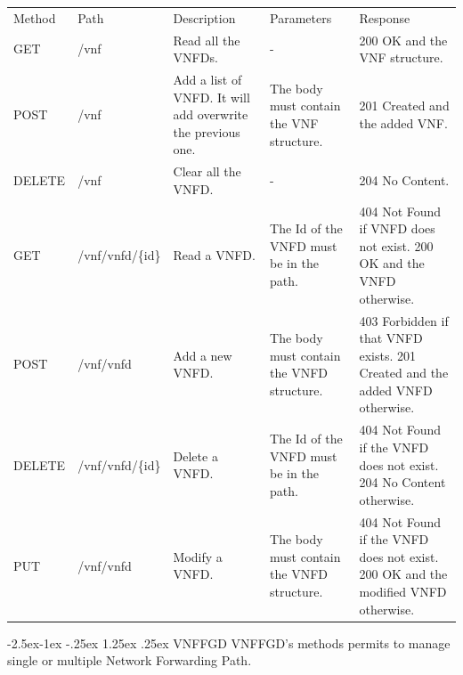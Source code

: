 \documentclass[11pt, english]{article}
\makeatletter
\renewcommand\paragraph{\@startsection{paragraph}{4}{\z@}%
            {-2.5ex\@plus -1ex \@minus -.25ex}%
            {1.25ex \@plus .25ex}%
            {\normalfont\normalsize\bfseries}}
\makeatother
\begin{document}
\begin{tabular}{ |p{2cm}|m{3cm}|p{3cm}|p{3cm}|p{4cm}| }
    \hline
    \rowcolor{black} \multicolumn{5}{|c|}{\textcolor{white}{VNF}} \\
    \hline
    \rowcolor{Gray}
    Method & Path & Description & Parameters & Response \\
    \hline
    GET   & /vnf & Read all the VNFDs. & - & 200 OK and the VNF structure. \\
    \hline
    POST & /vnf & Add a list of VNFD. It will add overwrite the previous one. & The body must contain the VNF structure. & 201 Created and the added VNF. \\
    \hline
    DELETE & /vnf & Clear all the VNFD. & - & 204 No Content. \\
    \hline
    GET & /vnf/vnfd/\{id\} & Read a VNFD. & The Id of the VNFD must be in the path. & 404 Not Found if VNFD does not exist. 200 OK and the VNFD otherwise. \\
    \hline
    POST & /vnf/vnfd & Add a new VNFD. & The body must contain the VNFD structure. & 403 Forbidden if that VNFD exists. 201 Created and the added VNFD otherwise. \\
    \hline
    DELETE & /vnf/vnfd/\{id\} & Delete a VNFD. & The Id of the VNFD must be in the path. & 404 Not Found if the VNFD does not exist. 204 No Content otherwise. \\
    \hline
    PUT & /vnf/vnfd & Modify a VNFD. & The body must contain the VNFD structure. & 404 Not Found if the VNFD does not exist. 200 OK and the modified VNFD otherwise. \\
    \hline
\end{tabular}

\newpage
\paragraph{VNFFGD}
VNFFGD's methods permits to manage single or multiple Network Forwarding Path. \\
\end{document}
